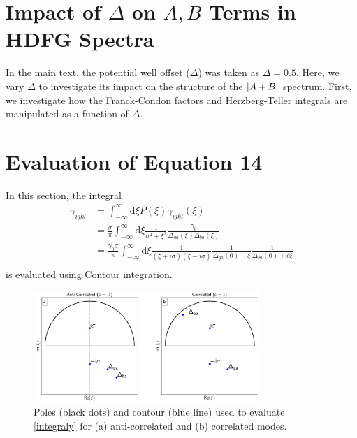 \documentclass[aip, jcp, reprint, onecolumn, nofootinbib]{revtex4-2}
\begin{document}
\section{Impact of $\Delta$ on $A,B$ Terms in HDFG Spectra}
In the main text, the potential well offset ($\Delta$) was taken as $\Delta = 0.5$.
Here, we vary $\Delta$ to investigate its impact on the structure of the $\abs{A+B}$ spectrum.
First, we investigate how the Franck-Condon factors and Herzberg-Teller integrals are manipulated as a function of $\Delta$.

\section{Evaluation of Equation 14}
In this section, the integral
\begin{equation}
	\begin{split}
		\gamma_{ijkl} &= \int_{-\infty}^\infty \mathrm{d}\xi P(\xi) \gamma_{ijkl}(\xi)\\
		&=\frac{\sigma}{\pi}\int_{-\infty}^\infty \mathrm{d}\xi \frac{1}{\sigma^2 + \xi^2} \frac{\gamma_0}{\Delta_{ga}(\xi)\Delta_{ba}(\xi)} \\
		&= \frac{\gamma_0 \sigma}{\pi} \int_{-\infty}^\infty \mathrm{d}\xi\frac{1}{(\xi + i\sigma)(\xi - i\sigma)} \frac{1}{\Delta_{ga}(0) - \xi} \frac{1}{\Delta_{ba}(0) + c\xi}\\
	\end{split}
\end{equation}
is evaluated using Contour integration.
\begin{figure}[!htbp]
	\centering
	\includegraphics[width=3.375in]{figures/corr_contour.png}
	\caption{Poles (black dots) and contour (blue line) used to evaluate \autoref{integraly} for (a) anti-correlated and (b) correlated modes.} 
	\label{fig:contours}
\end{figure}
\end{document}
